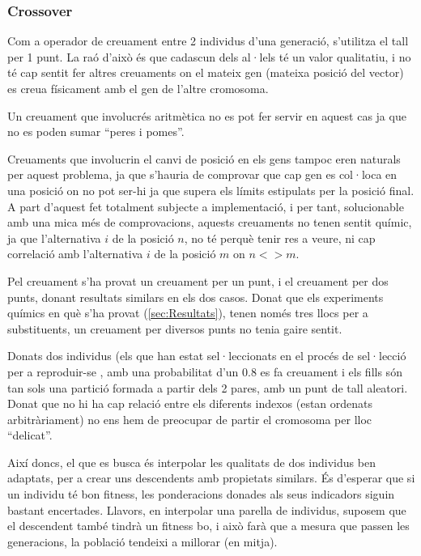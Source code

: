 \subsubsection{Crossover} %
\label{ssub:Crossover}

Com a operador de creuament entre 2 individus d'una generació, s'utilitza el
tall per 1 punt.  La raó d'això és que cadascun dels al·lels té un valor
qualitatiu, i no té cap sentit fer altres creuaments on el mateix gen (mateixa
posició del vector) es creua físicament amb el gen de l'altre cromosoma.

Un creuament que involucrés aritmètica no es pot fer servir en aquest cas ja que
no es poden sumar ``peres i pomes''.

Creuaments que involucrin el canvi de posició en els gens tampoc eren naturals
per aquest problema, ja que s'hauria de comprovar que cap gen es col·loca en una
posició on no pot ser-hi ja que supera els límits estipulats per la
posició final.  A part d'aquest fet totalment subjecte a implementació, i per
tant, solucionable amb una mica més de comprovacions, aquests creuaments no
tenen sentit químic, ja que l'alternativa $i$ de la posició $n$, no té perquè
tenir res a veure, ni cap correlació amb l'alternativa $i$ de la posició $m$ on
$n <> m$.

Pel creuament s'ha provat un creuament per un punt, i el creuament per dos
punts, donant resultats similars en els dos casos.  Donat que els experiments
químics en què s'ha provat (\ref{sec:Resultats}), tenen només tres llocs per a
substituents, un creuament per diversos punts no tenia gaire sentit.

Donats dos individus (els que han estat sel·leccionats en el procés de
sel·lecció per a reproduir-se , amb una probabilitat d'un 0.8 es fa creuament i
els fills són tan sols una partició formada a partir dels 2 pares, amb un punt
de tall aleatori.  Donat que no hi ha cap relació entre els diferents indexos
(estan ordenats arbitràriament) no ens hem de preocupar de partir el cromosoma
per lloc ``delicat''. 

Així doncs, el que es busca és interpolar les qualitats de dos individus ben
adaptats, per a crear uns descendents amb propietats similars.  És d'esperar que
si un individu té bon fitness, les ponderacions donades als seus indicadors
siguin bastant encertades.  Llavors, en interpolar una parella de individus,
suposem que el descendent també tindrà un fitness bo, i això farà que a mesura
que passen les generacions, la població tendeixi a millorar (en mitja).

